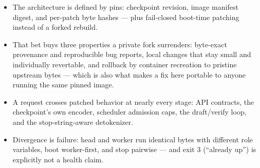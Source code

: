 \begin{itemize}
  \item The architecture is defined by pins: checkpoint revision, image
    manifest digest, and per-patch byte hashes --- plus fail-closed
    boot-time patching instead of a forked rebuild.
  \item That bet buys three properties a private fork surrenders:
    byte-exact provenance and reproducible bug reports, local changes that
    stay small and individually revertable, and rollback by container
    recreation to pristine upstream bytes --- which is also what makes a
    fix here portable to anyone running the same pinned image.
  \item A request crosses patched behavior at nearly every stage: API
    contracts, the checkpoint's own encoder, scheduler admission caps, the
    draft/verify loop, and the stop-string-aware detokenizer.
  \item Divergence is failure: head and worker run identical bytes with
    different role variables, boot worker-first, and stop pairwise ---
    and exit 3 (``already up'') is explicitly not a health claim.
\end{itemize}

